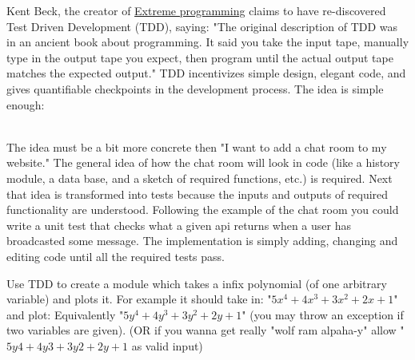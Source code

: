 Kent Beck, the creator of \href{https://en.wikipedia.org/wiki/Extreme_programming}{Extreme programming} claims to have re-discovered  Test Driven Development (TDD), saying:
"The original description of TDD was in an ancient book about programming. It said you take the input tape, manually type in the output tape you expect, then program until the actual output tape matches the expected output."
TDD incentivizes simple design, elegant code, and gives quantifiable checkpoints in the development process.
The idea is simple enough:
\\
The idea must be a bit more concrete then "I want to add a chat room to my website." The general idea of how the chat room will look in code (like a history module, a data base, and a sketch of required functions, etc.) is required.
Next that idea is transformed into tests because the inputs and outputs of required functionality are understood.
Following the example of the chat room you could write a unit test that checks what a given api returns when a user has broadcasted some message.
The implementation is simply adding, changing and editing code until all the required tests pass.

\begin{problem}
Use TDD to create a module which takes a infix polynomial (of one arbitrary variable) and plots it. For example it should take in:
"$5x^4 + 4x^3 + 3x^2+ 2x + 1$" and plot:
Equivalently "$5y^4 + 4y^3 + 3y^2+ 2y + 1$" (you may throw an exception if two variables are given).
(OR if you wanna get really "wolf ram alpaha-y" allow "$5y4 + 4y3 + 3y2+ 2y + 1$ as valid input)
\end{problem}



